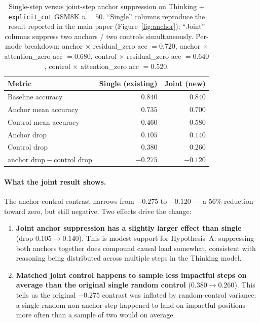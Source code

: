 \documentclass{article}
\theoremstyle{plain}
\theoremstyle{definition}
\theoremstyle{remark}
\begin{document}
\begin{table}[!htbp]
\centering
\small
\setlength{\tabcolsep}{4pt}
\begin{tabular}{@{}lrr@{}}
\toprule
Metric & Single (existing) & Joint (new) \\
\midrule
Baseline accuracy             & $0.840$ & $0.840$ \\
Anchor mean accuracy          & $0.735$ & $0.700$ \\
Control mean accuracy         & $0.460$ & $0.580$ \\
\midrule
Anchor drop                   & $0.105$ & $0.140$ \\
Control drop                  & $0.380$ & $0.260$ \\
$\mathrm{anchor\_drop} - \mathrm{control\_drop}$ & $-0.275$ & $-0.120$ \\
\bottomrule
\end{tabular}
\caption{Single-step versus joint-step anchor suppression on
Thinking + \texttt{explicit\_cot} GSM8K $n{=}50$. ``Single'' columns
reproduce the result reported in the main paper (Figure~\ref{fig:anchor});
``Joint'' columns suppress two anchors / two controls simultaneously.
Per-mode breakdown: anchor $\times$ residual\_zero acc $=0.720$,
anchor $\times$ attention\_zero acc $=0.680$, control $\times$
residual\_zero acc $=0.640$, control $\times$ attention\_zero acc
$=0.520$.}
\label{tab:joint-anchor}
\end{table}

\paragraph{What the joint result shows.} The anchor-control contrast
narrows from $-0.275$ to $-0.120$ --- a 56\% reduction toward zero,
but still negative. Two effects drive the change:

\begin{enumerate}
\item \textbf{Joint anchor suppression has a slightly larger effect
  than single} (drop $0.105 \to 0.140$). This is modest support for
  Hypothesis~A: suppressing both anchors together does compound
  causal load somewhat, consistent with reasoning being distributed
  across multiple steps in the Thinking model.
\item \textbf{Matched joint control happens to sample less impactful
  steps on average than the original single random control}
  ($0.380 \to 0.260$). This tells us the original $-0.275$ contrast
  was inflated by random-control variance: a single random
  non-anchor step happened to land on impactful positions more often
  than a sample of two would on average.
\end{enumerate}
\end{document}

